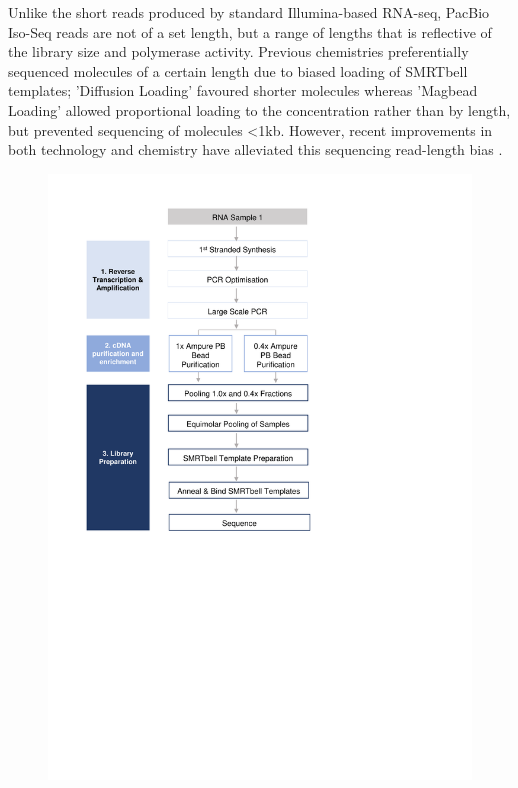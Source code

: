 Unlike the short reads produced by standard Illumina-based RNA-seq, PacBio Iso-Seq reads are not of a set length, but a range of lengths that is reflective of the library size and polymerase activity\cite{Ardui2018,Rhoads2015}. Previous chemistries preferentially sequenced molecules of a certain length due to biased loading of SMRTbell templates; 'Diffusion Loading' favoured shorter molecules\cite{Loomis2013} whereas 'Magbead Loading' allowed proportional loading to the concentration rather than by length, but prevented sequencing of molecules <1kb. However, recent improvements in both technology and chemistry have alleviated this sequencing read-length bias \cite{Oikonomopoulos2020}.

\begin{figure}[!h]
	\centering
	\includegraphics[page=14,trim={0 5cm 0 0 },clip, scale = 0.7]{Figures/ProjectDevelopment_Figures.pdf}

\end{figure}
